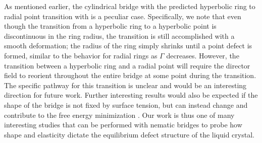 As mentioned earlier, the cylindrical bridge with the predicted hyperbolic ring to radial point transition with is a peculiar case.
Specifically, we note that even though the transition from a hyperbolic ring to a hyperbolic point is discontinuous in the ring radius, the transition is still accomplished with a smooth deformation; the radius of the ring simply shrinks until a point defect is formed, similar to the behavior for radial rings as $\Gamma$ decreases.
However, the transition between a hyperbolic ring and a radial point will require the director field to reorient throughout the entire bridge at some point during the transition.
The specific pathway for this transition is unclear and would be an interesting direction for future work.
Further interesting results would also be expected if the shape of the bridge is not fixed by surface tension, but can instead change and contribute to the free energy minimization \cite{RN12}.
Our work is thus one of many interesting studies that can be performed with nematic bridges to probe how shape and elasticity dictate the equilibrium defect structure of the liquid crystal.
